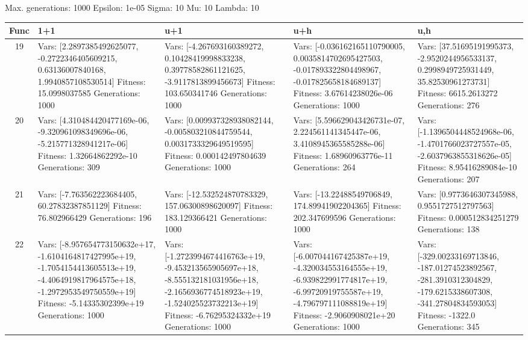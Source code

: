 \documentclass[landscape,11pt]{article}
\begin{document}
\newpage
Max. generations: 1000 Epsilon: 1e-05 Sigma: 10 Mu: 10 Lambda: 10 \\
\begin{tabular}{|c|p{5.4cm}|p{5.4cm}|p{5.4cm}|p{5.4cm}|}
\hline
Func & 1+1 & u+1 & u+h & u,h \\ 
\hline 19 & Vars: [2.2897385492625077, -0.2722346405609215, 0.63136007840168, 1.9940857108530514] Fitness: 15.0998037585 Generations: 1000 & Vars: [-4.267693160389272, 0.10428419998833238, 0.39778582861121625, -3.9117813899456673] Fitness: 103.650341746 Generations: 1000 & Vars: [-0.036162165110790005, 0.0035814702695427503, -0.017893322804498967, -0.017825658184689137] Fitness: 3.67614238026e-06 Generations: 1000 & Vars: [37.51695191995373, -2.9520244956533137, 0.2998949725931449, 35.82530961273731] Fitness: 6615.2613272 Generations: 276 \\
 \hline 
 20 & Vars: [4.310484420477169e-06, -9.320961098349696e-06, -5.215771328941217e-06] Fitness: 1.32664862292e-10 Generations: 309 & Vars: [0.009937328938082144, -0.005803210844759544, 0.0031733329649519595] Fitness: 0.000142497804639 Generations: 1000 & Vars: [5.596629043426731e-07, 2.224561141345447e-06, 3.4108945365585288e-06] Fitness: 1.68960963776e-11 Generations: 264 & Vars: [-1.1396504448524968e-06, -1.4701766023727557e-05, -2.6037963855318626e-05] Fitness: 8.95416289084e-10 Generations: 207 \\
 \hline 
 21 & Vars: [-7.763562223684405, 60.27832387851129] Fitness: 76.802966429 Generations: 196 & Vars: [-12.532524870783329, 157.06300898620097] Fitness: 183.129366421 Generations: 1000 & Vars: [-13.22488549706849, 174.89941902204365] Fitness: 202.347699596 Generations: 1000 & Vars: [0.9773646307345988, 0.9551727512797563] Fitness: 0.000512834251279 Generations: 138 \\
 \hline 
 22 & Vars: [-8.957654773150632e+17, -1.6104164817427995e+19, -1.7054154413605513e+19, -4.4064919817964575e+18, -1.2972953549750559e+19] Fitness: -5.14335302399e+19 Generations: 1000 & Vars: [-1.2723994674416763e+19, -9.453213565905697e+18, -8.555132181031956e+18, -2.1656936774518923e+19, -1.524025523732213e+19] Fitness: -6.76295324332e+19 Generations: 1000 & Vars: [-6.007044167425387e+19, -4.320034553164555e+19, -6.939822991774817e+19, -6.99720919755587e+19, -4.796797111088819e+19] Fitness: -2.9060908021e+20 Generations: 1000 & Vars: [-329.00233169713846, -187.01274523892567, -281.3910312304829, -179.6215338607308, -341.27804834593053] Fitness: -1322.0 Generations: 345 \\
 \hline 
\end{tabular}
\end{document}
